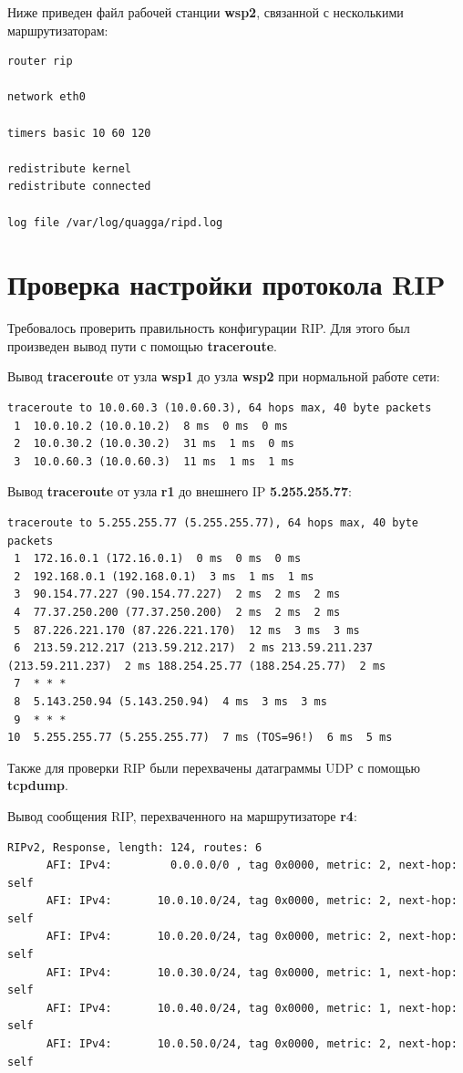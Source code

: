 \documentclass[a4paper,12pt]{article}
\begin{document}
Ниже приведен файл  рабочей станции \textbf{wsp2}, связанной с несколькими маршрутизаторам:

\begin{Verbatim}
router rip

network eth0

timers basic 10 60 120

redistribute kernel
redistribute connected

log file /var/log/quagga/ripd.log
\end{Verbatim}


\section{Проверка настройки протокола RIP}

Требовалось проверить правильность конфигурации RIP. Для этого был произведен вывод пути с помощью \textbf{traceroute}.

Вывод \textbf{traceroute} от узла \textbf{wsp1} до узла \textbf{wsp2} при нормальной работе сети:

\begin{Verbatim}
traceroute to 10.0.60.3 (10.0.60.3), 64 hops max, 40 byte packets
 1  10.0.10.2 (10.0.10.2)  8 ms  0 ms  0 ms
 2  10.0.30.2 (10.0.30.2)  31 ms  1 ms  0 ms
 3  10.0.60.3 (10.0.60.3)  11 ms  1 ms  1 ms
\end{Verbatim}

Вывод \textbf{traceroute} от узла \textbf{r1} до внешнего IP \textbf{5.255.255.77}:

\begin{Verbatim}
traceroute to 5.255.255.77 (5.255.255.77), 64 hops max, 40 byte packets
 1  172.16.0.1 (172.16.0.1)  0 ms  0 ms  0 ms
 2  192.168.0.1 (192.168.0.1)  3 ms  1 ms  1 ms
 3  90.154.77.227 (90.154.77.227)  2 ms  2 ms  2 ms
 4  77.37.250.200 (77.37.250.200)  2 ms  2 ms  2 ms
 5  87.226.221.170 (87.226.221.170)  12 ms  3 ms  3 ms
 6  213.59.212.217 (213.59.212.217)  2 ms 213.59.211.237 (213.59.211.237)  2 ms 188.254.25.77 (188.254.25.77)  2 ms
 7  * * *
 8  5.143.250.94 (5.143.250.94)  4 ms  3 ms  3 ms
 9  * * *
10  5.255.255.77 (5.255.255.77)  7 ms (TOS=96!)  6 ms  5 ms
\end{Verbatim}

Также для проверки RIP были перехвачены датаграммы UDP с помощью \textbf{tcpdump}.

Вывод сообщения RIP, перехваченного на маршрутизаторе \textbf{r4}:

\begin{Verbatim}
RIPv2, Response, length: 124, routes: 6
	  AFI: IPv4:         0.0.0.0/0 , tag 0x0000, metric: 2, next-hop: self
	  AFI: IPv4:       10.0.10.0/24, tag 0x0000, metric: 2, next-hop: self
	  AFI: IPv4:       10.0.20.0/24, tag 0x0000, metric: 2, next-hop: self
	  AFI: IPv4:       10.0.30.0/24, tag 0x0000, metric: 1, next-hop: self
	  AFI: IPv4:       10.0.40.0/24, tag 0x0000, metric: 1, next-hop: self
	  AFI: IPv4:       10.0.50.0/24, tag 0x0000, metric: 2, next-hop: self
\end{Verbatim}
\end{document}
